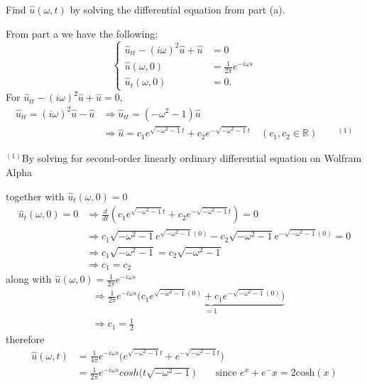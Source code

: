 \documentclass[12pt]{article}
\newcommand{\R}{\mathbb{R}}
\newcommand{\lra}{\Longrightarrow}
\newenvironment{subproblem}[2][Part]{\begin{trivlist}
  \item[\hskip \labelsep {\bfseries #1}\hskip \labelsep {\bfseries (#2)}]}{\end{trivlist}}
\newenvironment{solution}[1][Solution]{\begin{trivlist}
  \item[\hskip \labelsep {\bfseries #1} \hskip \labelsep]}{\end{trivlist}}
\theoremstyle{remark}
\begin{document}
\begin{subproblem}{b}
  Find \(\hat{u}(\omega,t)\) by solving the differential equation from part (a).
\end{subproblem}
\begin{solution}
  From part a we have the following:
  \[
    \left\{
      \begin{array}{ll}
        \hat{u}_{tt} - (i\omega)^2\hat{u} + \hat{u} &= 0 \\
        \hat{u}(\omega,0) &= \frac{1}{2\pi}e^{-i\omega s} \\
        \hat{u}_t(\omega,0) &= 0.
      \end{array}
    \right.
  \]
  For \(\hat{u}_{tt} - (i\omega)^2\hat{u} + \hat{u} = 0\),
  \begin{align*}
    \hat{u}_{tt} = (i\omega)^2\hat{u} - \hat{u} &\lra \hat{u}_{tt} = (-\omega^2 - 1)\hat{u} \\
                                                &\lra \hat{u} = c_1e^{\sqrt{-\omega^2-1}t}+
                                                  c_2e^{-\sqrt{-\omega^2-1}t}
                                                  \quad (c_1,c_2 \in \R)\qquad^{(1)}
  \end{align*}
  \begin{footnotesize}
    \(^{(1)}\)By solving for second-order linearly ordinary differential
    equation on Wolfram Alpha \\
  \end{footnotesize}
  $ $\\
  together with \(\hat{u}_t(\omega,0) = 0\)
  \begin{align*}
    \hat{u}_t(\omega,0) = 0 &\lra \frac{d}{dt}(c_1e^{\sqrt{-\omega^2-1}t}+ c_2e^{-\sqrt{-\omega^2-1}t}) = 0\\
                            &\lra c_1\sqrt{-\omega^2-1}e^{\sqrt{-\omega^2-1}(0)} -
                              c_2\sqrt{-\omega^2-1}e^{-\sqrt{-\omega^2-1}(0)} = 0 \\
                            &\lra c_1\sqrt{-\omega^2-1} = c_2\sqrt{-\omega^2-1} \\
                            &\lra c_1 = c_2 
  \end{align*}
  along with \(\hat{u}(\omega,0) = \frac{1}{2\pi}e^{-i\omega s}\)
  \begin{align*}
    &\lra \frac{1}{2\pi}e^{-i\omega s} \underbrace{\bigg(c_1e^{\sqrt{-\omega^2-1}(0)}+
      c_1e^{-\sqrt{-\omega^2-1}(0)} \bigg)}_{= 1} \\
    &\lra c_1 = \frac{1}{2}
  \end{align*}
  therefore
  \begin{align*}
    \hat{u}(\omega,t) &= \frac{1}{4\pi}e^{-i\omega s}\bigg(e^{\sqrt{-\omega^2-1}t}+
                        e^{-\sqrt{-\omega^2-1}t} \bigg) \\
                      &= \boxed{\frac{1}{2\pi}e^{-i\omega s}cosh\big(t\sqrt{-\omega^2-1} \big)}
                        \qquad \text{since } e^x + e^-x = 2\text{cosh}(x)\\
  \end{align*}
\end{solution}
\end{document}
